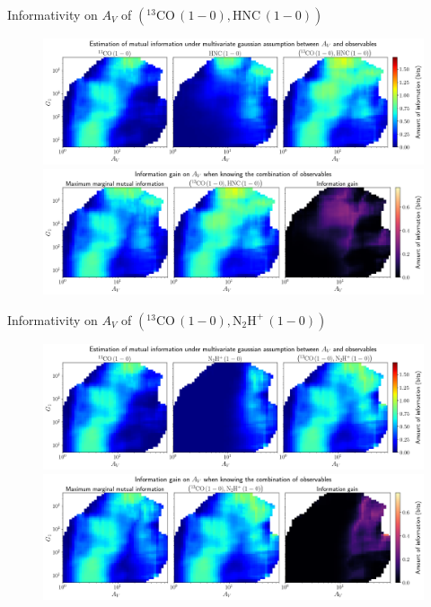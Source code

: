 \documentclass{beamer}
\begin{document}
\begin{frame}{Informativity on $A_V$ of $\left(\mathrm{^{13}CO\,(1-0)},\mathrm{HNC\,(1-0)}\right)$}
    \begin{figure}
        \centering
        \includegraphics[width=0.95\linewidth]{../linearinfogauss/av__13co10_hnc10_linearinfogauss.png}
        \vfill
        \includegraphics[width=0.95\linewidth]{../linearinfogauss/av__13co10_hnc10_linearinfogauss_gain.png}
    \end{figure}
\end{frame}

\begin{frame}{Informativity on $A_V$ of $\left(\mathrm{^{13}CO\,(1-0)},\mathrm{N_2H^+\,(1-0)}\right)$}
    \begin{figure}
        \centering
        \includegraphics[width=0.95\linewidth]{../linearinfogauss/av__13co10_n2hp10_linearinfogauss.png}
        \vfill
        \includegraphics[width=0.95\linewidth]{../linearinfogauss/av__13co10_n2hp10_linearinfogauss_gain.png}
    \end{figure}
\end{frame}
\end{document}
